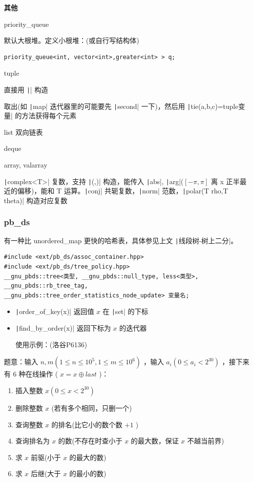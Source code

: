 \documentclass[twocolumn,10pt]{ctexart}
\makeatletter
\newcommand{\hfive}[1]{\par\addvspace{6pt}\@afterindentfalse
  {\noindent\bfseries\normalsize #1}\par\nobreak\vspace{2pt}}
\makeatother
\begin{document}
\hfive{其他}

priority\_queue

默认大根堆。定义小根堆：(或自行写结构体)

\begin{verbatim}
priority_queue<int, vector<int>,greater<int> > q;
\end{verbatim}

tuple

直接用 \texttt|{}| 构造

取出(如 \texttt|map| 迭代器里的可能要先 \texttt|second| 一下)，然后用 \texttt|tie(a,b,c)=tuple变量| 的方法获得每个元素

list 双向链表

deque

array, valarray

\texttt|complex<T>| 复数，支持 \texttt|(,)| 构造，能传入 \texttt|abs|, \texttt|arg|($[-\pi,\pi]$ 离 x 正半最近的偏移)，能和 T 运算。\texttt|conj| 共轭复数，\texttt|norm| 范数，\texttt|polar(T rho,T theta)| 构造对应复数

\subsubsection{pb\_ds}

有一种比 unordered\_map 更快的哈希表，具体参见上文 \texttt|线段树-树上二分|。

\begin{verbatim}
#include <ext/pb_ds/assoc_container.hpp>
#include <ext/pb_ds/tree_policy.hpp>
__gnu_pbds::tree<类型, __gnu_pbds::null_type, less<类型>, __gnu_pbds::rb_tree_tag, __gnu_pbds::tree_order_statistics_node_update> 变量名;
\end{verbatim}

\begin{itemize}
\item \texttt|order_of_key(x)| 返回值 $x$ 在 \texttt|set| 的下标
\item \texttt|find_by_order(x)| 返回下标为 $x$ 的迭代器

使用示例：(洛谷P6136)
\end{itemize}

\begin{notebox}
题意：输入 $n,\allowbreak{}m(1\le n\le10^5,\allowbreak{}1\le m\le10^6)$ ，输入 $a_i(0\le a_i < 2^{30})$ ，接下来有 $6$ 种在线操作 ( $x=x\oplus last$ )：

\begin{enumerate}
\item 插入整数 $x(0\le x < 2^{30})$
\item 删除整数 $x$ (若有多个相同，只删一个)
\item 查询整数 $x$ 的排名(比它小的数个数 $+1$ )
\item 查询排名为 $x$ 的数(不存在时查小于 $x$ 的最大数，保证 $x$ 不越当前界)
\item 求 $x$ 前驱(小于 $x$ 的最大的数)
\item 求 $x$ 后继(大于 $x$ 的最小的数)
\end{enumerate}
\end{notebox}
\end{document}
